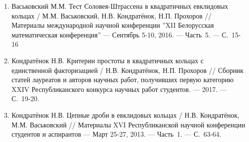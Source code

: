 \begin{enumerate}[label=\arabic*--A., ref=\arabic*--A]
    \item \label{source:BMK_2016}
    Васьковский М.М. Тест Соловея-Штрассена в квадратичных евклидовых кольцах / М.М. Васьковский, Н.В. Кондратёнок, Н.П. Прохоров // Материалы международной научной конференции ''XII Белорусская математическая конференция'' --- Сентябрь 5-10, 2016. --- Часть~5. --- С.~15-16

    \item \label{source:RCNR_2017}
    Кондратёнок Н.В. Критерии простоты в квадратичных кольцах с единственной факторизацией / Н.В. Кондратёнок, Н.П. Прохоров // Сборник статей лауреатов и авторов научных работ, получивших первую категорию XXIV Республиканского конкурса научных работ студентов. --- 2017. --- С.~19-20.

    \item \label{source:RNKS_2013}
    Кондратёнок Н.В. Цепные дроби в евклидовых кольцах / Н.В. Кондратёнок, М.М. Васьковский // Материалы XVI Республиканской научной конференции студентов и аспирантов --- Март 25-27, 2013. --- Часть~1. --- С.~63-64.
\end{enumerate}
